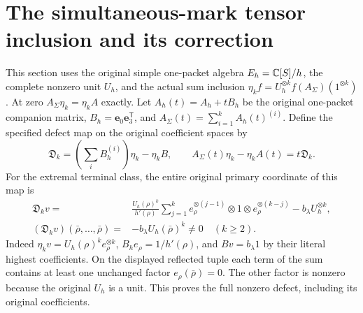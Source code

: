 \documentclass[11pt,a4paper]{article}
\begin{document}
\section{The simultaneous-mark tensor inclusion and its correction}
This section uses the original simple one-packet algebra
$E_h=\mathbb C[S]/h$, the complete nonzero unit $U_h$, and the actual
sum inclusion
$\eta_k f=U_h^{\otimes k}f(A_\Sigma)(1^{\otimes k})$.
At zero $A_\Sigma\eta_k=\eta_k A$ exactly. Let
$A_h(t)=A_h+tB_h$ be the original one-packet companion matrix,
$B_h=\mathbf e_0\mathbf e_3^{\mathsf T}$, and
$A_\Sigma(t)=\sum_{i=1}^k A_h(t)^{(i)}$.
Define the specified defect map on the original coefficient spaces by
\begin{equation}\tag{MAR23}\label{a02mar:mar:tensordefect}
 \mathfrak D_k=\left(\sum_iB_h^{(i)}\right)\eta_k-\eta_k B,
 \qquad A_\Sigma(t)\eta_k-\eta_k A(t)=t\mathfrak D_k.
\end{equation}
For the extremal terminal class, the entire original primary
coordinate of this map is
\begin{equation}\tag{MAR24}\label{a02mar:mar:Dv}
 \begin{aligned}
 \mathfrak D_kv={}&\frac{U_h(\rho)^k}{h'(\rho)}
 \sum_{j=1}^k e_\rho^{\otimes(j-1)}\otimes1
                         \otimes e_\rho^{\otimes(k-j)}
                 -b_\lambda U_h^{\otimes k},\\
 (\mathfrak D_kv)(\bar\rho,\ldots,\bar\rho)
       ={}&-b_\lambda U_h(\bar\rho)^k\ne0\quad(k\ge2).
 \end{aligned}
\end{equation}
Indeed $\eta_kv=U_h(\rho)^ke_\rho^{\otimes k}$,
$B_he_\rho=1/h'(\rho)$, and $Bv=b_\lambda1$ by their literal
highest coefficients. On the displayed reflected tuple each
term of the sum contains at least one unchanged factor
$e_\rho(\bar\rho)=0$. The other factor is nonzero because the
original $U_h$ is a unit. This proves the full nonzero defect,
including its original coefficients.
\end{document}
